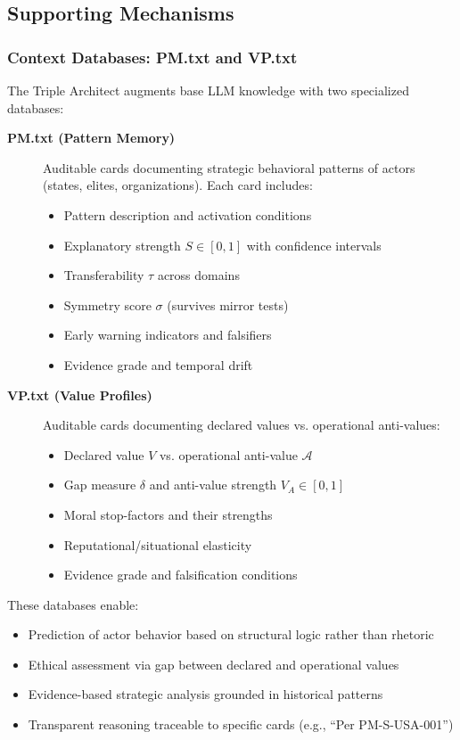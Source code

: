 \documentclass[11pt,a4paper]{article}
\theoremstyle{definition}
\theoremstyle{remark}
\begin{document}
\subsection{Supporting Mechanisms}

\subsubsection{Context Databases: PM.txt and VP.txt}

The Triple Architect augments base LLM knowledge with two specialized databases:

\begin{description}
    \item[\textbf{PM.txt (Pattern Memory)}] Auditable cards documenting strategic behavioral patterns of actors (states, elites, organizations). Each card includes:
    \begin{itemize}
        \item Pattern description and activation conditions
        \item Explanatory strength $S \in [0,1]$ with confidence intervals
        \item Transferability $\tau$ across domains
        \item Symmetry score $\sigma$ (survives mirror tests)
        \item Early warning indicators and falsifiers
        \item Evidence grade and temporal drift
    \end{itemize}
    
    \item[\textbf{VP.txt (Value Profiles)}] Auditable cards documenting declared values vs. operational anti-values:
    \begin{itemize}
        \item Declared value $V$ vs. operational anti-value $\mathcal{A}$
        \item Gap measure $\delta$ and anti-value strength $V_A \in [0,1]$
        \item Moral stop-factors and their strengths
        \item Reputational/situational elasticity
        \item Evidence grade and falsification conditions
    \end{itemize}
\end{description}

These databases enable:
\begin{itemize}
    \item Prediction of actor behavior based on structural logic rather than rhetoric
    \item Ethical assessment via gap between declared and operational values
    \item Evidence-based strategic analysis grounded in historical patterns
    \item Transparent reasoning traceable to specific cards (e.g., ``Per PM-S-USA-001'')
\end{itemize}
\end{document}
